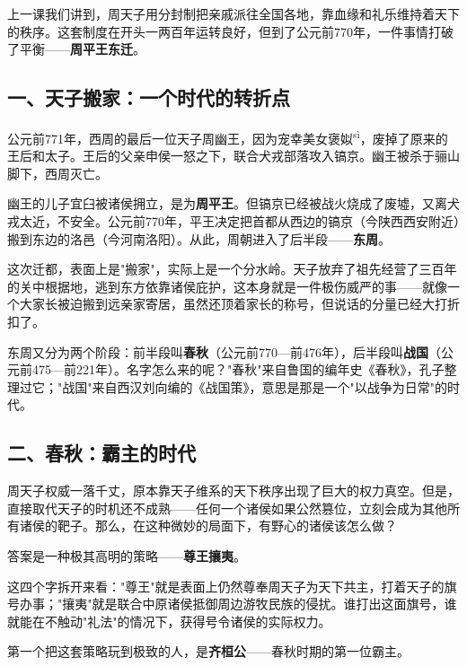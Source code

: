\documentclass[a4paper,12pt]{ctexart}
\newcommand{\ruby}[2]{#1\textsuperscript{#2}}
\begin{document}
上一课我们讲到，周天子用分封制把亲戚派往全国各地，靠血缘和礼乐维持着天下的秩序。这套制度在开头一两百年运转良好，但到了公元前770年，一件事情打破了平衡——\textbf{周平王东迁}。

\subsection*{一、天子搬家：一个时代的转折点}

公元前771年，西周的最后一位天子周幽王，因为宠幸美女褒\ruby{姒}{sì}，废掉了原来的王后和太子。王后的父亲申侯一怒之下，联合犬戎部落攻入镐京。幽王被杀于骊山脚下，西周灭亡。

幽王的儿子宜臼被诸侯拥立，是为\textbf{周平王}。但镐京已经被战火烧成了废墟，又离犬戎太近，不安全。公元前770年，平王决定把首都从西边的镐京（今陕西西安附近）搬到东边的洛邑（今河南洛阳）。从此，周朝进入了后半段——\textbf{东周}。

这次迁都，表面上是"搬家"，实际上是一个分水岭。天子放弃了祖先经营了三百年的关中根据地，逃到东方依靠诸侯庇护，这本身就是一件极伤威严的事——就像一个大家长被迫搬到远亲家寄居，虽然还顶着家长的称号，但说话的分量已经大打折扣了。

东周又分为两个阶段：前半段叫\textbf{春秋}（公元前770—前476年），后半段叫\textbf{战国}（公元前475—前221年）。名字怎么来的呢？"春秋"来自鲁国的编年史《春秋》，孔子整理过它；"战国"来自西汉刘向编的《战国策》，意思是那是一个"以战争为日常"的时代。

\subsection*{二、春秋：霸主的时代}

周天子权威一落千丈，原本靠天子维系的天下秩序出现了巨大的权力真空。但是，直接取代天子的时机还不成熟——任何一个诸侯如果公然篡位，立刻会成为其他所有诸侯的靶子。那么，在这种微妙的局面下，有野心的诸侯该怎么做？

答案是一种极其高明的策略——\textbf{尊王攘夷}。

这四个字拆开来看："尊王"就是表面上仍然尊奉周天子为天下共主，打着天子的旗号办事；"攘夷"就是联合中原诸侯抵御周边游牧民族的侵扰。谁打出这面旗号，谁就能在不触动"礼法"的情况下，获得号令诸侯的实际权力。

第一个把这套策略玩到极致的人，是\textbf{齐桓公}——春秋时期的第一位霸主。
\end{document}
